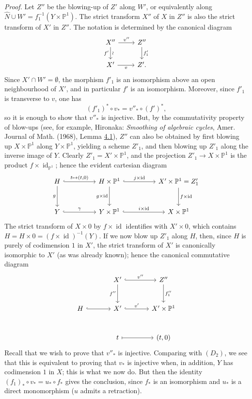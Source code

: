 \documentclass[11pt]{article}
\begin{document}
\emph{Proof.} Let $Z''$ be the blowing-up of $Z'$ along $W'$, or equivalently along $\widehat N\cup W'=f_1^{-1}(Y\times\mathbb P^1)$. The strict transform $X''$ of $X$ in $Z''$ is also the strict transform of $X'$ in $Z''$. The notation is determined by the canonical diagram
\[
\begin{tikzcd}
X''\arrow[r,"v''"]\arrow[d,"f'"',"\wr"]&Z''\arrow[d,"f'_1"]\\
X'\arrow[r,"v"']&Z'.
\end{tikzcd}
\]
Since $X'\cap W'=\emptyset$, the morphism $f'_1$ is an isomorphism above an open neighbourhood of $X'$, and in particular $f'$ is an isomorphism. Moreover, since $f'_1$ is transverse to $v$, one has
\[
(f'_1)^*\circ v_*=v''_*\circ(f')^*,
\tag{9.8.8}\label{sga5:VII:equation:9.8.8}
\]
so it is enough to show that $v''_*$ is injective. But, by the commutativity property of blow-ups (see, for example, Hironaka: \emph{Smoothing of algebraic cycles}, Amer. Journal of Math. (1968), Lemma \hyperref[sga5:VII:theorem:4.1]{4.1}), $Z''$ can also be obtained by first blowing up $X\times\mathbb P^1$ along $Y\times\mathbb P^1$, yielding a scheme $Z'_1$, and then blowing up $Z'_1$ along the inverse image of $Y$. Clearly $Z'_1=X'\times\mathbb P^1$, and the projection $Z'_1\to X\times\mathbb P^1$ is the product $f\times\operatorname{id}_{\mathbb P^1}$; hence the evident cartesian diagram
\[
\begin{tikzcd}[column sep=huge,row sep=large]
H\arrow[r,hook,"{t\mapsto(t,0)}"]\arrow[d,"g"']&H\times\mathbb P^1\arrow[r,hook,"{j\times\operatorname{id}}"]\arrow[d,"{g\times\operatorname{id}}"']&X'\times\mathbb P^1=Z'_1\arrow[d,"{f\times\operatorname{id}}"]\\
Y\arrow[r,hook,"\gamma"]&Y\times\mathbb P^1\arrow[r,hook,"{i\times\operatorname{id}}"]&X\times\mathbb P^1
\end{tikzcd}
\]
The strict transform of $X\times0$ by $f\times\operatorname{id}$ identifies with $X'\times0$, which contains $H=H\times0=(f\times\operatorname{id})^{-1}(Y)$. If we now blow up $Z'_1$ along $H$, then, since $H$ is purely of codimension $1$ in $X'$, the strict transform of $X'$ is canonically isomorphic to $X'$ (as was already known); hence the canonical commutative diagram
\[
\begin{tikzcd}[column sep=large,row sep=large]
&X'\arrow[r,hook,"v''"]\arrow[d,"f''"']&Z''\arrow[d,"f''_1"]\\
H\arrow[r,hook]&X'\arrow[r,hook,"v'"]&X'\times\mathbb P^1\\
&t\arrow[r,mapsto]&{(t,0)}
\end{tikzcd}
\]
Recall that we wish to prove that $v''_*$ is injective. Comparing with $(D_2)$, we see that this is equivalent to proving that $v_*$ is injective when, in addition, $Y$ has codimension $1$ in $X$; this is what we now do. But then the identity $(f_1)_*\circ v_*=u_*\circ f_*$ gives the conclusion, since $f_*$ is an isomorphism and $u_*$ is a direct monomorphism ($u$ admits a retraction).
\end{document}
